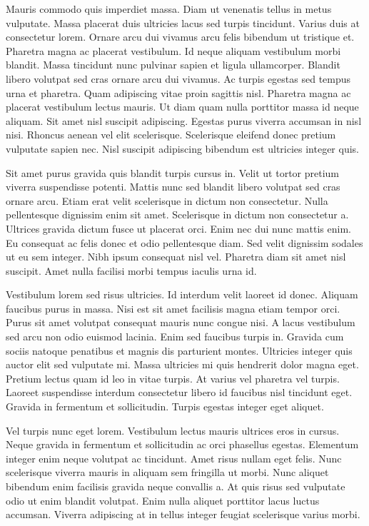 Mauris commodo quis imperdiet massa. Diam ut venenatis tellus in 
metus vulputate. Massa placerat duis ultricies lacus sed turpis 
tincidunt. Varius duis at consectetur lorem. Ornare arcu dui vivamus 
arcu felis bibendum ut tristique et. Pharetra magna ac placerat 
vestibulum. Id neque aliquam vestibulum morbi blandit. Massa tincidunt 
nunc pulvinar sapien et ligula ullamcorper. Blandit libero volutpat sed 
cras ornare arcu dui vivamus. Ac turpis egestas sed tempus urna et 
pharetra. Quam adipiscing vitae proin sagittis nisl. Pharetra magna ac 
placerat vestibulum lectus mauris. Ut diam quam nulla porttitor massa id
 neque aliquam. Sit amet nisl suscipit adipiscing. Egestas purus viverra
 accumsan in nisl nisi. Rhoncus aenean vel elit scelerisque. Scelerisque
 eleifend donec pretium vulputate sapien nec. Nisl suscipit adipiscing 
bibendum est ultricies integer quis.


Sit amet purus gravida quis blandit turpis cursus in. Velit ut tortor
 pretium viverra suspendisse potenti. Mattis nunc sed blandit libero 
volutpat sed cras ornare arcu. Etiam erat velit scelerisque in dictum 
non consectetur. Nulla pellentesque dignissim enim sit amet. Scelerisque
 in dictum non consectetur a. Ultrices gravida dictum fusce ut placerat 
orci. Enim nec dui nunc mattis enim. Eu consequat ac felis donec et odio
 pellentesque diam. Sed velit dignissim sodales ut eu sem integer. Nibh 
ipsum consequat nisl vel. Pharetra diam sit amet nisl suscipit. Amet 
nulla facilisi morbi tempus iaculis urna id.


Vestibulum lorem sed risus ultricies. Id interdum velit laoreet id 
donec. Aliquam faucibus purus in massa. Nisi est sit amet facilisis 
magna etiam tempor orci. Purus sit amet volutpat consequat mauris nunc 
congue nisi. A lacus vestibulum sed arcu non odio euismod lacinia. Enim 
sed faucibus turpis in. Gravida cum sociis natoque penatibus et magnis 
dis parturient montes. Ultricies integer quis auctor elit sed vulputate 
mi. Massa ultricies mi quis hendrerit dolor magna eget. Pretium lectus 
quam id leo in vitae turpis. At varius vel pharetra vel turpis. Laoreet 
suspendisse interdum consectetur libero id faucibus nisl tincidunt eget.
 Gravida in fermentum et sollicitudin. Turpis egestas integer eget 
aliquet.


Vel turpis nunc eget lorem. Vestibulum lectus mauris ultrices eros in
 cursus. Neque gravida in fermentum et sollicitudin ac orci phasellus 
egestas. Elementum integer enim neque volutpat ac tincidunt. Amet risus 
nullam eget felis. Nunc scelerisque viverra mauris in aliquam sem 
fringilla ut morbi. Nunc aliquet bibendum enim facilisis gravida neque 
convallis a. At quis risus sed vulputate odio ut enim blandit volutpat. 
Enim nulla aliquet porttitor lacus luctus accumsan. Viverra adipiscing 
at in tellus integer feugiat scelerisque varius morbi.



